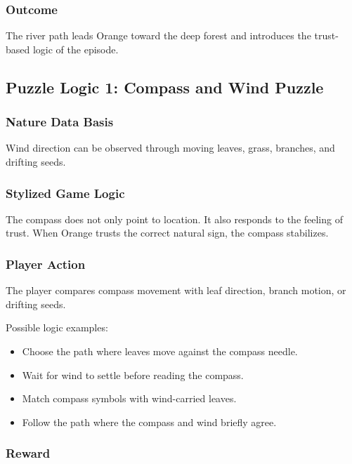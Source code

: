\documentclass[12pt]{article}
\begin{document}
\subsubsection{Outcome}

The river path leads Orange toward the deep forest and introduces the trust-based logic of the episode.

\subsection{Puzzle Logic 1: Compass and Wind Puzzle}

\subsubsection{Nature Data Basis}

Wind direction can be observed through moving leaves, grass, branches, and drifting seeds.

\subsubsection{Stylized Game Logic}

The compass does not only point to location. It also responds to the feeling of trust. When Orange trusts the correct natural sign, the compass stabilizes.

\subsubsection{Player Action}

The player compares compass movement with leaf direction, branch motion, or drifting seeds.

Possible logic examples:

\begin{itemize}[leftmargin=*]
    \item Choose the path where leaves move against the compass needle.
    \item Wait for wind to settle before reading the compass.
    \item Match compass symbols with wind-carried leaves.
    \item Follow the path where the compass and wind briefly agree.
\end{itemize}

\subsubsection{Reward}
\end{document}
